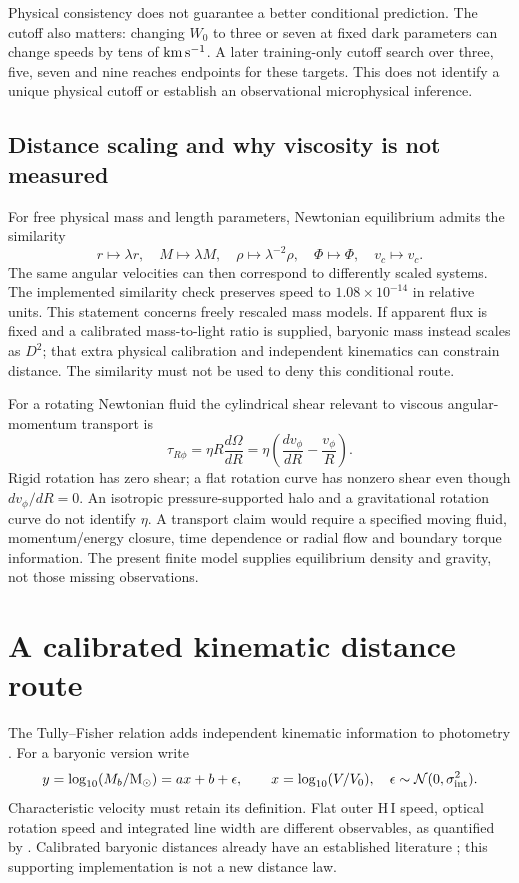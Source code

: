 \documentclass[10pt]{article}
\begin{document}
Physical consistency does not guarantee a better conditional prediction. The
cutoff also matters: changing $W_0$ to three or seven at fixed dark parameters
can change speeds by tens of $\mathrm{km\,s^{-1}}$. A later training-only cutoff search
over three, five, seven and nine reaches endpoints for these targets. This
does not identify a unique physical cutoff or establish an observational
microphysical inference.

\subsection{Distance scaling and why viscosity is not measured}
For free physical mass and length parameters, Newtonian equilibrium admits
the similarity
\begin{equation}
 r\mapsto\lambda r,\quad M\mapsto\lambda M,\quad
 \rho\mapsto\lambda^{-2}\rho,\quad
 \Phi\mapsto\Phi,\quad v_c\mapsto v_c.
\end{equation}
The same angular velocities can then correspond to differently scaled
systems. The implemented similarity check preserves speed to
$1.08\times10^{-14}$ in relative units. This statement concerns freely
rescaled mass models. If apparent flux is fixed and a calibrated
mass-to-light ratio is supplied, baryonic mass instead scales as $D^2$;
that extra physical calibration and independent kinematics can constrain
distance. The similarity must not be used to deny this conditional route.

For a rotating Newtonian fluid the cylindrical shear relevant to viscous
angular-momentum transport is
\begin{equation}
 \tau_{R\phi}=\eta R\frac{d\Omega}{dR}
 =\eta\left(\frac{dv_\phi}{dR}-\frac{v_\phi}{R}\right).
\end{equation}
Rigid rotation has zero shear; a flat rotation curve has nonzero shear even
though $dv_\phi/dR=0$. An isotropic pressure-supported halo and a gravitational
rotation curve do not identify $\eta$. A transport claim would require a
specified moving fluid, momentum/energy closure, time dependence or radial
flow and boundary torque information. The present finite model supplies
equilibrium density and gravity, not those missing observations.

\section{A calibrated kinematic distance route}
The Tully--Fisher relation adds independent kinematic information to photometry
\citep{tully1977}. For a baryonic version write
\begin{equation}
 y=\log_{10}(M_b/\mathrm{M}_{\odot})=a x+b+\epsilon,\qquad
 x=\log_{10}(V/V_0),\quad
 \epsilon\sim\mathcal N(0,\sigma_{\rm int}^2).
\end{equation}
Characteristic velocity must retain its definition. Flat outer H\,I speed,
optical rotation speed and integrated line width are different observables,
as quantified by \citet{lelli2019}. Calibrated baryonic distances already
have an established literature \citep{schombert2020}; this supporting
implementation is not a new distance law.
\end{document}
